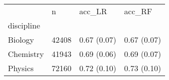 \begin{tabular}{llll}
\toprule
{} &      n &       acc\_LR &       acc\_RF \\
discipline &        &              &              \\
\midrule
Biology    &  42408 &  0.67 (0.07) &  0.67 (0.07) \\
Chemistry  &  41943 &  0.69 (0.06) &  0.69 (0.07) \\
Physics    &  72160 &  0.72 (0.10) &  0.73 (0.10) \\
\bottomrule
\end{tabular}
